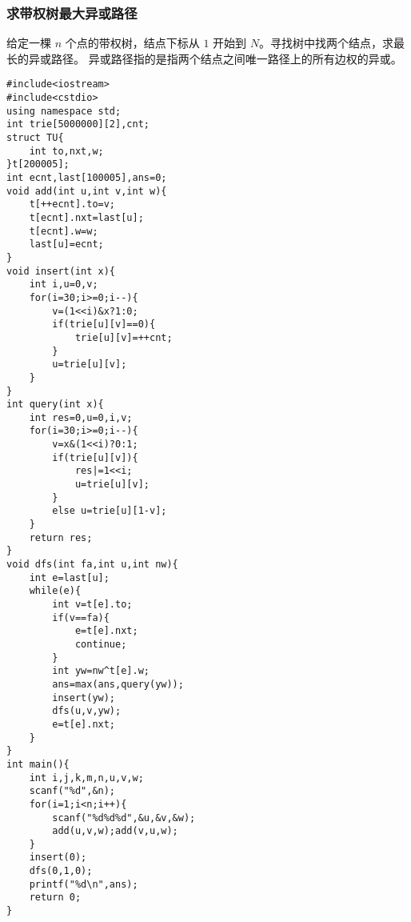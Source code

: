 \subsubsection{求带权树最大异或路径}
	给定一棵 $n$ 个点的带权树，结点下标从 $1$ 开始到 $N$。寻找树中找两个结点，求最长的异或路径。
	异或路径指的是指两个结点之间唯一路径上的所有边权的异或。
	\begin{lstlisting}
#include<iostream>
#include<cstdio>
using namespace std;
int trie[5000000][2],cnt;
struct TU{
	int to,nxt,w;
}t[200005];
int ecnt,last[100005],ans=0;
void add(int u,int v,int w){
	t[++ecnt].to=v;
	t[ecnt].nxt=last[u];
	t[ecnt].w=w; 
	last[u]=ecnt;
}
void insert(int x){
	int i,u=0,v;
	for(i=30;i>=0;i--){
		v=(1<<i)&x?1:0;
		if(trie[u][v]==0){
			trie[u][v]=++cnt;
		}
		u=trie[u][v];
	}
}
int query(int x){
	int res=0,u=0,i,v;
	for(i=30;i>=0;i--){
		v=x&(1<<i)?0:1;
		if(trie[u][v]){
			res|=1<<i;
			u=trie[u][v];
		}
		else u=trie[u][1-v];
	}
	return res;
}
void dfs(int fa,int u,int nw){
	int e=last[u];
	while(e){
		int v=t[e].to;
		if(v==fa){
			e=t[e].nxt;
			continue;
		}
		int yw=nw^t[e].w;
		ans=max(ans,query(yw));
		insert(yw);
		dfs(u,v,yw);
		e=t[e].nxt;
	}
}
int main(){
	int i,j,k,m,n,u,v,w;
	scanf("%d",&n);
	for(i=1;i<n;i++){
		scanf("%d%d%d",&u,&v,&w);
		add(u,v,w);add(v,u,w);
	}
	insert(0);
	dfs(0,1,0);
	printf("%d\n",ans);
	return 0;
}\end{lstlisting}

